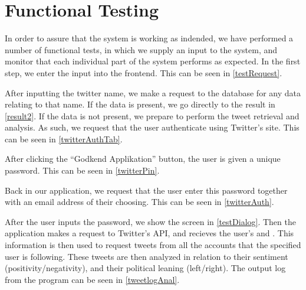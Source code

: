 \section{Functional Testing}

In order to assure that the system is working as indended, we have
performed a number of functional tests, in which we supply an input to the system, and
monitor that each individual part of the system performs as expected. In the
first step, we enter the input into the frontend. This can be seen in
\autoref{testRequest}.\nl 


After inputting the twitter name, we make a request to the database for any data
relating to that name. If the data is present, we go directly to the result in
\autoref{result2}. If the data is not present, we prepare to perform the tweet
retrieval and analysis. As such, we request that the user authenticate using
Twitter's site. This can be seen in \autoref{twitterAuthTab}.\nl


After clicking the ``Godkend Applikation'' button, the user is given a unique
password. This can be seen in \autoref{twitterPin}.\nl


Back in our application, we request that the user enter this password
together with an email address of their choosing. This can be seen in
\autoref{twitterAuth}.\nl


After the user inputs the password, we show the screen in \autoref{testDialog}.
Then the application makes a request to Twitter's API, and recieves the user's
 and . This information is
then used to request tweets from all the accounts that the specified user is
following. These tweets are then analyzed in relation to their sentiment
(positivity/negativity), and their political leaning (left/right). The output
log from the program can be seen in \autoref{tweetlogAnal}. \nl

